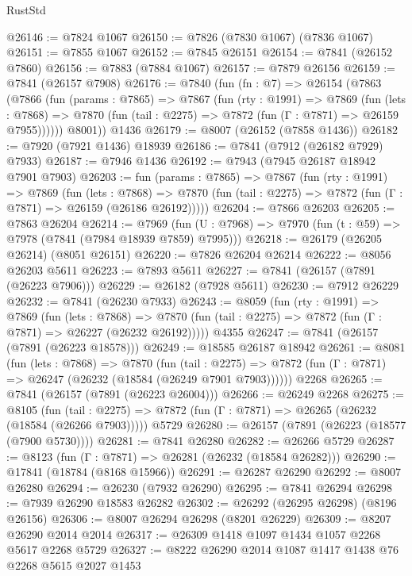 \begin{lexlean}{RustStd}
\begin{coremodule}
@26146 := @7824 @1067
@26150 := @7826 (@7830 @1067) (@7836 @1067)
@26151 := @7855 @1067
@26152 := @7845 @26151
@26154 := @7841 (@26152 @7860)
@26156 := @7883 (@7884 @1067)
@26157 := @7879 @26156
@26159 := @7841 (@26157 @7908)
@26176 := @7840
    (fun (fn : @7) =>
    @26154
      (@7863
        (@7866
          (fun (params : @7865) =>
          @7867
            (fun (rty : @1991) =>
            @7869
              (fun (lets : @7868) =>
              @7870 (fun (tail : @2275) => @7872 (fun (Γ : @7871) => @26159 @7955))))))
        @8001))
    @1436
@26179 := @8007 (@26152 (@7858 @1436))
@26182 := @7920 (@7921 @1436) @18939
@26186 := @7841 (@7912 (@26182 @7929) @7933)
@26187 := @7946 @1436
@26192 := @7943 (@7945 @26187 @18942 @7901 @7903)
@26203 := fun (params : @7865) =>
  @7867
    (fun (rty : @1991) =>
    @7869
      (fun (lets : @7868) =>
      @7870 (fun (tail : @2275) => @7872 (fun (Γ : @7871) => @26159 (@26186 @26192)))))
@26204 := @7866 @26203
@26205 := @7863 @26204
@26214 := @7969
    (fun (U : @7968) => @7970 (fun (t : @59) => @7978 (@7841 (@7984 @18939 @7859) @7995)))
@26218 := @26179 (@26205 @26214) (@8051 @26151)
@26220 := @7826 @26204 @26214
@26222 := @8056 @26203 @5611
@26223 := @7893 @5611
@26227 := @7841 (@26157 (@7891 (@26223 @7906)))
@26229 := @26182 (@7928 @5611)
@26230 := @7912 @26229
@26232 := @7841 (@26230 @7933)
@26243 := @8059
    (fun (rty : @1991) =>
    @7869
      (fun (lets : @7868) =>
      @7870 (fun (tail : @2275) => @7872 (fun (Γ : @7871) => @26227 (@26232 @26192)))))
    @4355
@26247 := @7841 (@26157 (@7891 (@26223 @18578)))
@26249 := @18585 @26187 @18942
@26261 := @8081
    (fun (lets : @7868) =>
    @7870
      (fun (tail : @2275) =>
      @7872 (fun (Γ : @7871) => @26247 (@26232 (@18584 (@26249 @7901 @7903))))))
    @2268
@26265 := @7841 (@26157 (@7891 (@26223 @26004)))
@26266 := @26249 @2268
@26275 := @8105
    (fun (tail : @2275) => @7872 (fun (Γ : @7871) => @26265 (@26232 (@18584 (@26266 @7903)))))
    @5729
@26280 := @26157 (@7891 (@26223 (@18577 (@7900 @5730))))
@26281 := @7841 @26280
@26282 := @26266 @5729
@26287 := @8123 (fun (Γ : @7871) => @26281 (@26232 (@18584 @26282)))
@26290 := @17841 (@18784 (@8168 @15966))
@26291 := @26287 @26290
@26292 := @8007 @26280
@26294 := @26230 (@7932 @26290)
@26295 := @7841 @26294
@26298 := @7939 @26290 @18583 @26282
@26302 := @26292 (@26295 @26298) (@8196 @26156)
@26306 := @8007 @26294 @26298 (@8201 @26229)
@26309 := @8207 @26290 @2014 @2014
@26317 := @26309 @1418 @1097 @1434 @1057 @2268 @5617 @2268 @5729
@26327 := @8222 @26290 @2014 @1087 @1417 @1438 @76 @2268 @5615 @2027 @1453

\end{coremodule}
\end{lexlean}
